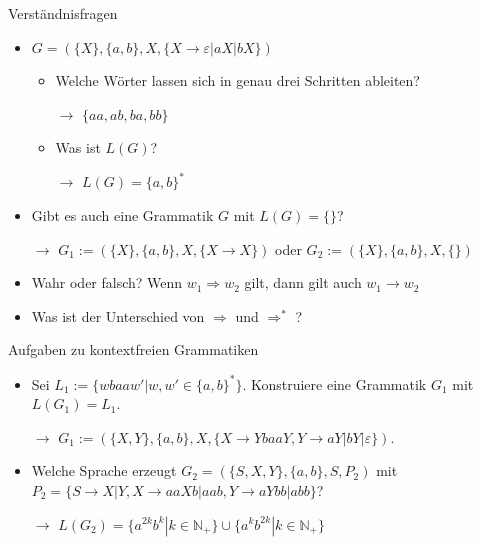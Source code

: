 \documentclass[handout]{beamer}
\begin{document}
\begin{frame}{Verständnisfragen}
	\begin{itemize}
		\item $G = (\{X\}, \{a,b\}, X, \{X \rightarrow \varepsilon| aX| bX\})$
		\begin{itemize}
			\item Welche Wörter lassen sich in genau drei Schritten ableiten?
			\pause		 		
			\item[$\rightarrow$] $\{aa, ab, ba, bb\}$
			\pause
			\item Was ist $L(G)$?
			\pause		 		
			\item[$\rightarrow$] $L(G) = \{a,b\}^*$
		\end{itemize}
		\pause
		\item Gibt es auch eine Grammatik $G$ mit $L(G) = \{\}$?
		\pause
		\item[$\rightarrow$] $G_1 := (\{X\}, \{a,b\}, X, \{X\rightarrow X\})$ oder $G_2 := (\{X\}, \{a,b\}, X, \{\})$
		\pause
		\item Wahr oder falsch? Wenn $w_1 \Rightarrow w_2$ gilt, dann gilt auch $w_1 \rightarrow w_2$
		\pause
		\item Was ist der Unterschied von $\Rightarrow$ und $\Rightarrow^*$ ?
	\end{itemize}
\end{frame}

\begin{frame}
	\begin{taskblock}{Aufgaben zu kontextfreien Grammatiken}
		\begin{itemize}
			\item Sei $L_1 := \{wbaaw'|w, w' \in \{a,b\}^*\}$. Konstruiere eine Grammatik $G_1$ mit $L(G_1) = L_1$.
			\pause
			\item[$\rightarrow$] $G_1 := (\{X, Y\}, \{a,b\}, X, \{X \rightarrow YbaaY, Y \rightarrow aY|bY|\varepsilon\})$.
			\pause
			\item  Welche Sprache erzeugt $ G_2 = (\{S, X, Y\}, \{a,b\}, S, P_2)$  mit $P_2 = \{S \rightarrow X|Y, X \rightarrow aaXb|aab, Y \rightarrow aYbb|abb\}$?
			\pause			
			\item[$\rightarrow$] $L(G_2) = \{a^{2k}b^{k} | k \in \mathbb{N}_+\} \cup \{a^kb^{2k}| k \in \mathbb{N}_+\}$
		\end{itemize}
	\end{taskblock}	
\end{frame}
\end{document}
